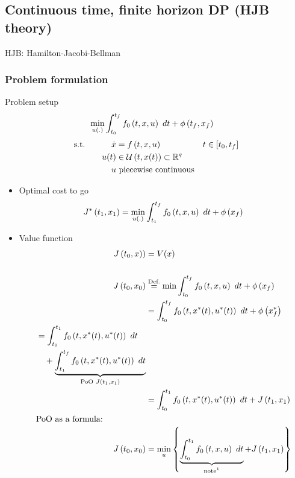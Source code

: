 \subsection{Continuous time, finite horizon DP (HJB theory)}
HJB: Hamilton-Jacobi-Bellman%
%
\subsubsection{Problem formulation}
\begin{optExample}{Problem setup}
\begin{align}
\min_{u(.)} & \int_{t_0}^{t_f}  f_0 \left( t,x,u \right)  ~dt + \phi \left( t_f, x_f \right) 
\end{align}
\begin{alignat*}{6}
\st{} \quad&&
  \dot{x} &= f \paren{\txu} &&t \in [t_0, t_f]     \\
&& u(t)    &\in \setU{t, x(t)} \subset \R^q\\
&&~ u &\txt{ piecewise continuous}
\end{alignat*}
\end{optExample}

\begin{itemize}
\item Optimal cost to go
    \begin{align}
    J^* \left( t_1, x_1 \right) = \min_{u(.)}
        \int_{t_1}^{t_f}  f_0 \left( t,x,u \right)  ~dt + \phi \left( x_f \right)
    \end{align}
\item Value function
    \begin{align*}
    J \paren{t_0,x)} &= V(x)\\
    \\
    J \paren{t_0,x_0} 
        &\overtext{Def.}{=}
        \min \intdt{t_0}{t_f}{ f_0 \paren{\txu} } + \phi \paren{x_f}\\
        &= \intdt{t_0}{t_f}{ f_0 \paren{\txuOpt} } + \phi \paren{x_f^*}\\
        \begin{split}
            &= \intdt{t_0}{t_1}{ f_0 \paren{\txuOpt} } \\
        &\quad + \underbrace{ \intdt{t_1}{t_f}{ f_0 \paren{\txuOpt} } }_{\txt{PoO } J \paren{t_1,x_1} }
        \end{split}\\
        &= \intdt{t_0}{t_1}{ f_0 \paren{\txuOpt} } + J \paren{t_1,x_1}\\
    \intertext{PoO as a formula:}
    J \paren{t_0,x_0}
        &= \min_{u} \set{ \underbrace{\intdt{t_0}{t_1}{ f_0 \paren{\txu} }}_{\txt{note\footnotemark}} + J \paren{t_1,x_1} }
    \end{align*}
\end{itemize}


